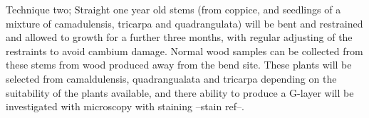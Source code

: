 Technique two; Straight one year old stems (from coppice, and seedlings of a
mixture of camadulensis, tricarpa and quadrangulata) will be bent and restrained
and allowed to growth for a further three months, with regular adjusting of the
restraints to avoid cambium damage. Normal wood samples can be collected from
these stems from wood produced away from the bend site. These plants will be
selected from camaldulensis,
quadrangualata and tricarpa depending on the suitability of the plants
available, and there ability to produce a G-layer will be investigated with
microscopy with staining --stain ref--.